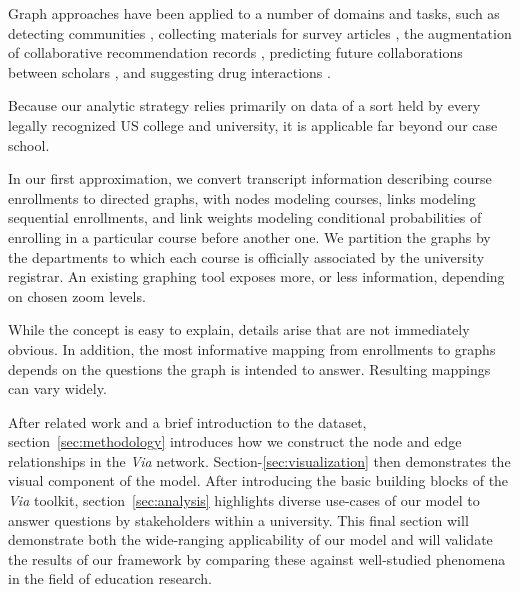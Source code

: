 Graph approaches have been applied to a number of
domains and tasks, such as detecting communities
\cite{Fortunato2004}, collecting materials for survey articles
\cite{ji2015}, the augmentation of collaborative recommendation
records \cite{huang2005}, predicting future collaborations between
scholars \cite{liben2007}, and suggesting drug interactions
\cite{zitnik2018}.

Because our analytic strategy relies primarily on data of a sort held by every legally recognized US college and university, it is applicable far beyond our case school. 


In our first approximation, we convert transcript information describing course enrollments to directed graphs, with nodes modeling courses, links modeling sequential enrollments, and link weights modeling conditional probabilities of enrolling in a particular course before another one. We partition the graphs by the departments to which each course is officially associated by the university registrar. An existing graphing tool \cite{shannon2003cytoscape} exposes more, or less information, depending on chosen zoom levels.

While the concept is easy to explain, details arise that are not
immediately obvious. In addition, the most informative mapping from
enrollments to graphs depends on the questions the graph is intended
to answer. Resulting mappings can vary widely.


After related work and a brief introduction to the dataset, section~\ref{sec:methodology} introduces how we construct the node and edge relationships in the \textit{Via} network. Section-\ref{sec:visualization} then demonstrates the visual component of the model. After introducing the basic building blocks of the \textit{Via} toolkit, section~\ref{sec:analysis} highlights diverse use-cases of our model to answer questions by stakeholders within a university. This final section will demonstrate both the wide-ranging applicability of our model and will validate the results of our framework by comparing these against well-studied phenomena in the field of education research.


